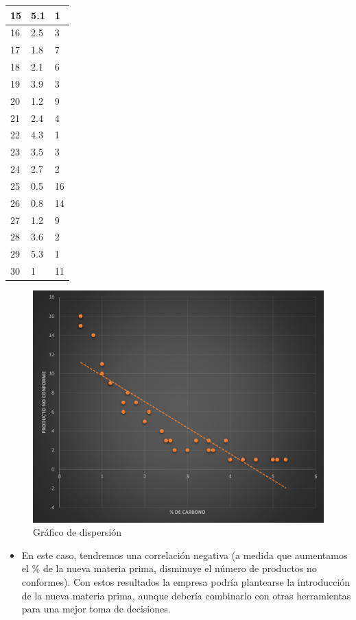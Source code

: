 \documentclass{article}
\theoremstyle{mytheoremstyle}
\theoremstyle{mytheoremstyle}
\theoremstyle{myproblemstyle}
\begin{document}
\begin{enumerate}
\begin{itemize}
\begin{itemize}
\begin{table}[H]
\begin{tabular}{|l|l|l|}
					15 & 5.1 & 1 \\ \hline
					16 & 2.5 & 3 \\ \hline
					17 & 1.8 & 7 \\ \hline
					18 & 2.1 & 6 \\ \hline
					19 & 3.9 & 3 \\ \hline
					20 & 1.2 & 9 \\ \hline
					21 & 2.4 & 4 \\ \hline
					22 & 4.3 & 1 \\ \hline
					23 & 3.5 & 3 \\ \hline
					24 & 2.7 & 2 \\ \hline
					25 & 0.5 & 16 \\ \hline
					26 & 0.8 & 14 \\ \hline
					27 & 1.2 & 9 \\ \hline
					28 & 3.6 & 2 \\ \hline
					29 & 5.3 & 1 \\ \hline
					30 & 1 & 11 \\ \hline
				\end{tabular}
			\end{table}
		\end{itemize}
\end{itemize}
\begin{figure}[H]
	\centering
	\includegraphics[width=\textwidth]{Dispersion1.png}
	\caption[short]{Gráfico de dispersión}
	\label{fig:imagen2}
  \end{figure}
  \begin{itemize}
	\item En este caso, tendremos una correlación negativa (a medida que aumentamos el \% de la nueva materia prima, disminuye el número de productos no conformes). Con estos resultados la empresa podría plantearse la introducción de la nueva materia prima, aunque debería combinarlo con otras herramientas para una mejor toma de decisiones.
  \end{itemize}\newpage

\end{enumerate}
\end{document}
